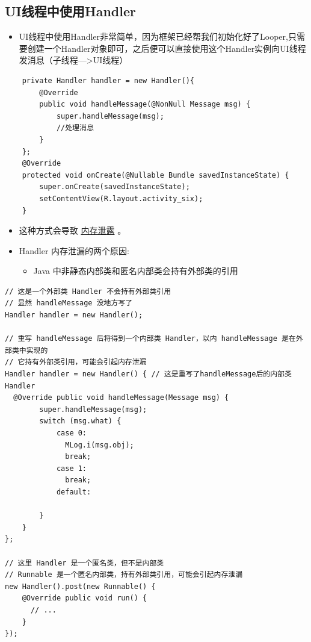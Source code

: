 \documentclass[9pt, b5paper]{article}
\begin{document}
\subsection{UI线程中使用Handler}
\label{sec-2-1}
\begin{itemize}
\item UI线程中使用Handler非常简单，因为框架已经帮我们初始化好了Looper,只需要创建一个Handler对象即可，之后便可以直接使用这个Handler实例向UI线程发消息（子线程--->UI线程）
\end{itemize}
\begin{verbatim}
    private Handler handler = new Handler(){
        @Override
        public void handleMessage(@NonNull Message msg) {
            super.handleMessage(msg);
            //处理消息
        }
    };
    @Override
    protected void onCreate(@Nullable Bundle savedInstanceState) {
        super.onCreate(savedInstanceState);
        setContentView(R.layout.activity_six);
    }
\end{verbatim}
\begin{itemize}
\item 这种方式会导致 \uline{内存泄露} 。
\item Handler 内存泄漏的两个原因: 
\begin{itemize}
\item Java 中非静态内部类和匿名内部类会持有外部类的引用
\end{itemize}
\end{itemize}
\begin{verbatim}
// 这是一个外部类 Handler 不会持有外部类引用
// 显然 handleMessage 没地方写了
Handler handler = new Handler();

// 重写 handleMessage 后将得到一个内部类 Handler，以内 handleMessage 是在外部类中实现的
// 它持有外部类引用，可能会引起内存泄漏
Handler handler = new Handler() { // 这是重写了handleMessage后的内部类Handler
  @Override public void handleMessage(Message msg) {
        super.handleMessage(msg);
        switch (msg.what) {
            case 0:
              MLog.i(msg.obj);
              break;
            case 1:
              break;
            default:

        }
    }
};

// 这里 Handler 是一个匿名类，但不是内部类
// Runnable 是一个匿名内部类，持有外部类引用，可能会引起内存泄漏
new Handler().post(new Runnable() {
    @Override public void run() {
      // ...
    }
});
\end{verbatim}
\end{document}
